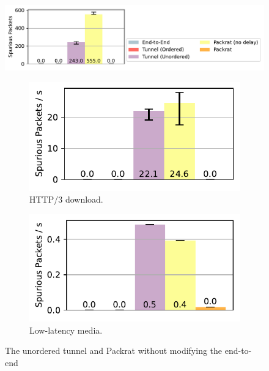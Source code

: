 \begin{figure}[ht]
\centering
\begin{minipage}[t]{0.3\textwidth}
    \includegraphics[width=\linewidth, trim=245 15 5 65, clip]{packrat/figures/spurious_retx_legend.pdf}
    \begin{subfigure}[b]{\linewidth}
        \includegraphics[width=\linewidth]{packrat/figures/spurious_retx_http.pdf}
        \caption{HTTP/3 download.}
        \label{fig:packrat:spurious:http}
    \end{subfigure}
    \begin{subfigure}[b]{\linewidth}
        \includegraphics[width=\linewidth]{packrat/figures/spurious_retx_media.pdf}
        \caption{Low-latency media.}
        \label{fig:packrat:spurious:media}
    \end{subfigure}
    \caption{The unordered tunnel and Packrat without modifying the end-to-end
}
\end{minipage}
\end{figure}
